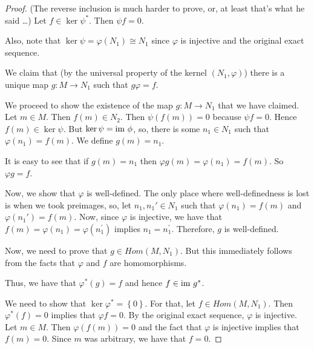 \begin{proof}
    (The reverse inclusion is much harder to prove, or, at least that's what he said \ldots)
    Let $f\in \ker \psi ^{*}$. Then $\psi f =0$. 

    Also, note that $\ker \psi = \varphi (N_1 ) \cong N_1$ since $\varphi$ is injective and the original exact sequence.

    We claim that (by the universal property of the kernel $\left( N_1 , \varphi \right)$) there is a unique map $g: M \to N_1$ such that $g \varphi =f$.
	\begin{center}
    \end{center}

    We proceed to show the existence of the map $g: M \to N_1$ that we have claimed. Let $m \in M$. Then $f(m) \in N_2$. Then $\psi (f(m))=0$ because $\psi f =0$. Hence $f\left( m \right) \in \ker \psi$. But $\ker \psi = {\text{im }} \phi$, so, there is some $n_1 \in N_1$ such that $\varphi (n_1) = f(m)$. We define $g\left( m \right) = n_1$.

    It is easy to see that if $g(m)=n_1$ then $\varphi g (m ) = \varphi (n_1) = f(m)$. So $\varphi g = f$.

    Now, we show that $\varphi$ is well-defined. The only place where well-definedness is lost is when we took preimages, so, let $n_1 , n_1 ' \in N_1$ such that $\varphi (n_1 ) = f(m)$ and $\varphi (n_1 ' ) = f(m)$. Now, since $\varphi$ is injective, we have that $f(m)=\varphi (n_1) = \varphi (n_1 ^{'})$ implies $n_1 = n_1 ^{'}$. Therefore, $g$ is well-defined.

    Now, we need to prove that $g\in Hom \left( M, N_1 \right)$. But this immediately follows from the facts that $\varphi$ and $f$ are homomorphisms. 

    Thus, we have that $\varphi ^{*} \left( g \right) = f$ and hence $f \in {\text{im }} g^{*}$.

    We need to show that $\ker \varphi ^{*} = \left\{ 0 \right\}$. For that, let $f \in Hom (M, N_1 )$. Then $\varphi ^{*} (f)=0$ implies that $\varphi f =0$. By the original exact sequence, $\varphi$ is injective. Let $m \in M$. Then $\varphi (f(m))=0$ and the fact that $\varphi$ is injective implies that $f(m)=0$. Since $m$ was arbitrary, we have that $f=0$.

\end{proof}

